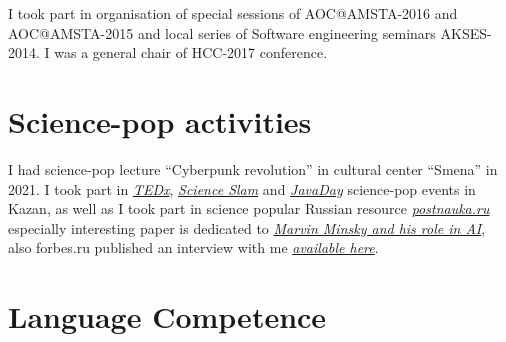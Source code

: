 \documentclass{moderncv}
\begin{document}
    I took part in organisation of special sessions of AOC@AMSTA-2016 and AOC@AMSTA-2015 and local series of Software engineering seminars AKSES-2014. I was a general chair of HCC-2017 conference.

    \section{Science-pop activities}
    I had science-pop lecture ``Cyberpunk revolution'' in cultural center ``Smena'' in 2021.
    I took part in \href{https://www.youtube.com/watch?v=BLvS7h3kRbo}{\emph{TEDx}}, \href{https://vk.com/video-87488544_171504962}{\emph{Science Slam}} and \href{https://www.youtube.com/watch?v=sLLKxvUEA7E}{\emph{JavaDay}} science-pop events in Kazan, as well as I took part in science popular Russian resource \href{https://postnauka.ru/author/talanov}{\emph{postnauka.ru}} especially interesting paper is dedicated to \href{https://postnauka.ru/faq/58727}{\emph{Marvin Minsky and his role in AI}}, also forbes.ru published an interview with me \href{http://www.forbes.ru/mneniya-column/288097-kak-sozdat-emotsionalnyi-iskusstvennyi-intellekt}{\emph{available here}}.

    \section{Language Competence}


\end{document}
